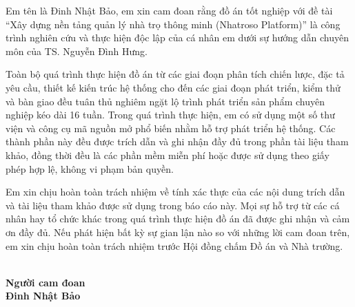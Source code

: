 \begin{declaration}
Em tên là Đinh Nhật Bảo, em xin cam đoan rằng đồ án tốt nghiệp với đề tài ``Xây dựng nền tảng quản lý nhà trọ thông minh (Nhatroso Platform)'' là công trình nghiên cứu và thực hiện độc lập của cá nhân em dưới sự hướng dẫn chuyên môn của TS. Nguyễn Đình Hưng.

Toàn bộ quá trình thực hiện đồ án từ các giai đoạn phân tích chiến lược, đặc tả yêu cầu, thiết kế kiến trúc hệ thống cho đến các giai đoạn phát triển, kiểm thử và bàn giao đều tuân thủ nghiêm ngặt lộ trình phát triển sản phẩm chuyên nghiệp kéo dài 16 tuần. Trong quá trình thực hiện, em có sử dụng một số thư viện và công cụ mã nguồn mở phổ biến nhằm hỗ trợ phát triển hệ thống. Các thành phần này đều được trích dẫn và ghi nhận đầy đủ trong phần tài liệu tham khảo, đồng thời đều là các phần mềm miễn phí hoặc được sử dụng theo giấy phép hợp lệ, không vi phạm bản quyền.

Em xin chịu hoàn toàn trách nhiệm về tính xác thực của các nội dung trích dẫn và tài liệu tham khảo được sử dụng trong báo cáo này. Mọi sự hỗ trợ từ các cá nhân hay tổ chức khác trong quá trình thực hiện đồ án đã được ghi nhận và cảm ơn đầy đủ. Nếu phát hiện bất kỳ sự gian lận nào so với những lời cam đoan trên, em xin chịu hoàn toàn trách nhiệm trước Hội đồng chấm Đồ án và Nhà trường.


\begin{flushright}
    \cttime \\
    \textbf{Người cam đoan} \\
    \vspace{2cm}
    \textbf{Đinh Nhật Bảo}
\end{flushright}
\end{declaration}
\newpage
